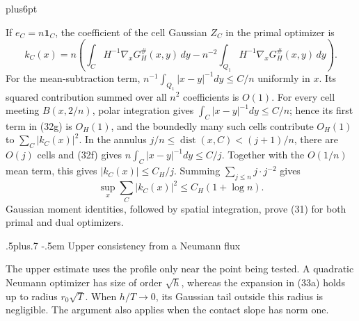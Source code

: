 \documentclass[11pt,reqno]{amsart}
\makeatletter
\def\subsection{\@startsection{subsection}{2}{0pt}%
  {.5\linespacing plus.7\linespacing}
  {-.5em}
  {\normalfont\scshape}}
\theoremstyle{plain}
\theoremstyle{definition}
\theoremstyle{remark}
\renewenvironment{proof}[1][\proofname]{%
  \par
  \pushQED{\qed}%
  \normalfont
  \topsep6pt plus6pt\relax
  \trivlist
  \item[\hskip\labelsep\slshape #1\@addpunct{.}]%
  \ignorespaces
}{%
  \popQED
  \endtrivlist
  \@endpefalse
}
\DeclareRobustCommand{\qed}{%
  \leavevmode\unskip\penalty9999\hbox{}\nobreak
  \ifmmode
    \makebox[0pt][l]{\qquad\hbox{\qedsymbol}}%
  \else
    \qquad\hbox{\qedsymbol}%
  \fi
}
\renewcommand{\qedsymbol}{\rule[.47pt]{4pt}{6pt}}
\numberwithin{equation}{section}
\newcommand{\1}{\mathbf 1}
\makeatother
\begin{document}
\begin{proof}
If $e_ C=n\mathbf1_ C$, the coefficient of the cell Gaussian $Z_ C$
in the primal optimizer is
\begin{equation}
k_ C(x)=n\left(\int_ C H^{-1}\nabla_ xG_ H^\#(x,y)\,dy
-n^{-2}\int_ {Q_ 1}H^{-1}\nabla_ xG_ H^\#(x,y)\,dy\right).
\tag{32g}
\end{equation}
For the mean-subtraction term,
$n^{-1}\int_ {Q_ 1}|x-y|^{-1}dy\leq C/n$ uniformly in $x$.
Its squared contribution summed over all $n^2$ coefficients is $O(1)$.
For every cell meeting $B(x,2/n)$, polar integration gives
$\int_ C|x-y|^{-1}dy\leq C/n$; hence its first term in (32g) is
$O_ H(1)$, and the boundedly many such cells contribute $O_ H(1)$ to
$\sum_ C|k_ C(x)|^2$.  In the annulus
$j/n\leq\operatorname {dist}(x,C)<(j+1)/n$, there are $O(j)$
cells and (32f) gives
$n\int_ C|x-y|^{-1}dy\leq C/j$.  Together with the $O(1/n)$
mean term, this gives $|k_ C(x)|\leq C_ H/j$.  Summing
$\sum_ {j\leq n}j\cdot j^{-2}$ gives
\begin{equation}
\sup_ x\sum_ C|k_ C(x)|^2\leq C_ H(1+\log n).
\tag{32h}
\end{equation}
Gaussian moment identities, followed by spatial integration, prove
(31) for both primal and dual optimizers.

\end{proof}

\subsection{Upper consistency from a Neumann flux}

The upper estimate uses the profile only near the point being tested.
A quadratic Neumann optimizer has size of order $\sqrt h$, whereas
the expansion in (33a) holds up to radius $r_0\sqrt T$.
When $h/T\to0$, its Gaussian tail outside this radius is negligible.
The argument also applies when the contact slope has norm one.
\end{document}
